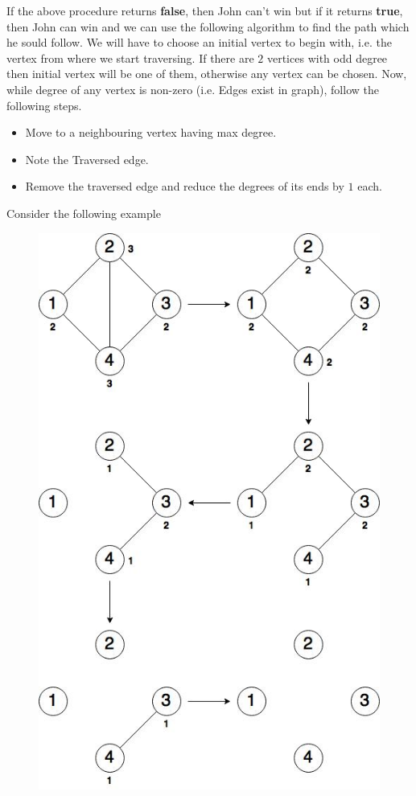 \documentclass{article}
\let\bold\textbf
\begin{document}
{  If the above procedure returns \bold{false}, then John can't win but if it returns \bold{true}, then John can win and we can use the following algorithm to find the path which he sould follow.
  \newline \newline We will have to choose an initial vertex to begin with, i.e. the vertex from where we start traversing.
  \newline If there are $2$ vertices with odd degree then initial vertex will be one of them, otherwise any vertex can be chosen.
  \newpage
  \noindent Now, while degree of any vertex is non-zero (i.e. Edges exist in graph), follow the following steps.
  \begin{itemize}
    \item{Move to a neighbouring vertex having max degree.}
    \item{Note the Traversed edge.}
    \item{Remove the traversed edge and reduce the degrees of its ends by $1$ each.}
  \end{itemize}
  Consider the following example
  \begin{figure}[h]
    \centering
    \includegraphics[scale=0.5]{euler}

\end{figure}}
\end{document}
